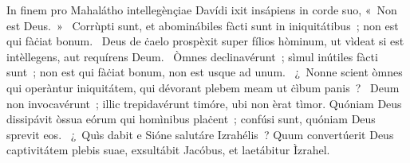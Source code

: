 { In finem pro Mahalátho intellegènçiae Davídi}
{%
ixit insápiens in corde suo, «~Non est Deus.~»
~Corrùpti sunt, et abominábiles fàcti sunt in iniquitátibus~; non est qui fàċiat bonum. 
~Deus de ċaelo prospèxit super fílios hòminum, ut vìdeat si est intèllegens, aut requírens Deum. 
~Òmnes declinavérunt~; sìmul inútiles fàcti sunt~; non est qui fàċiat bonum, non est usque ad unum. 
~¿~Nonne scient òmnes qui operàntur iniquitátem, qui dévorant plebem meam ut ċìbum panis~? 
~Deum non invocavérunt~; illic trepidavérunt timóre, ubi non èrat tìmor. Quóniam Deus dissipávit òssua eórum qui homìnibus plaċent~; confúsi sunt, quóniam Deus sprevit eos. 
~¿~Quìs dabit e Sióne salutáre Izrahélis~? Quum convertúerit Deus captivitátem plebis suae, exsultábit Jacóbus, et laetábitur Ìzrahel. 
}
